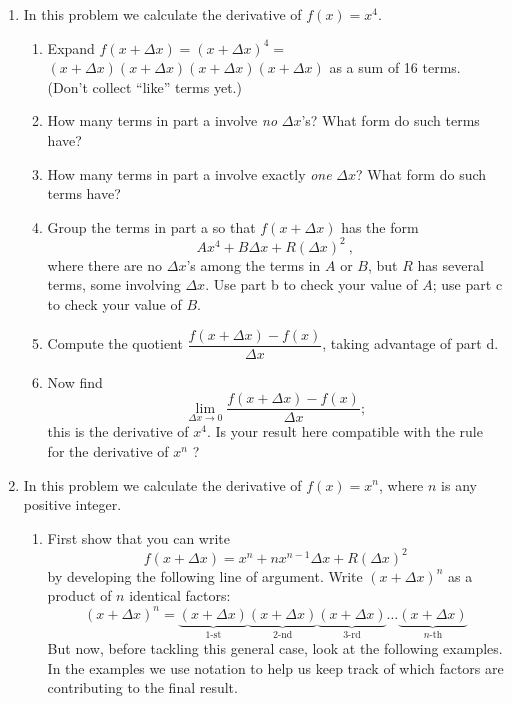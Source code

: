 \begin{enumerate}
\item In this problem we calculate the derivative of $f(x) = x^4$.

  \begin{enumerate}
  \item Expand $f(x + \Delta x) = (x + \Delta x)^4 =$ $(x + \Delta x)(x +
\Delta x)(x + \Delta x)(x + \Delta x)$ as a sum of 16 terms.  (Don't
collect ``like'' terms yet.)


  \item How many terms in part a involve {\em no\/} $\Delta x$'s?  What
form do such terms have?

  \item How many terms in part a involve exactly {\em one\/} $\Delta x$?
What form do such terms have?

  \item Group the terms in  part a  so that  $f(x + \Delta x)$  has the form
	\[
Ax^4 + B \Delta x + R (\Delta x)^2 \ ,
\]  
where there are no  $\Delta x$'s  among the terms in  $A$  or  $B$, but  $R$  has several terms, some involving  $\Delta x$.  Use part b to check your value of  $A$;  use part c to check your value of  $B$.

  \item Compute the quotient
$\dfrac{f(x + \Delta x) - f(x)}{\Delta x}$, taking advantage of  part d.

  \item Now find
	\[
\lim_{\Delta x \rightarrow 0} 
\dfrac{f(x + \Delta x) - f(x)}{\Delta x};
\]
this is the derivative of $x^4$.  Is your result here compatible with the rule for the derivative of $x^n$ ?


\end{enumerate}
\item In this problem we calculate the derivative of $f(x) = x^n$,
where $n$ is any positive integer.

  \begin{enumerate}
  \item First show that you can write
	\[
f(x + \Delta x) = x^n + nx^{n-1} \Delta x + R (\Delta x)^2
\]
by developing the following line of argument.  Write  $(x + \Delta x)^n$  as a product of  $n$  identical factors:
	\[
(x + \Delta x)^n = \underbrace{(x + \Delta x)}_{1\mbox{-st}}
                   \underbrace{(x + \Delta x)}_{2\mbox{-nd}}
                   \underbrace{(x + \Delta x)}_{3\mbox{-rd}} 
            \ldots \underbrace{(x + \Delta x)}_{n\mbox{-th}}
\] 
But now, before tackling this general case, look at the following
examples.  In the examples we use notation to help us keep track of
which factors are contributing to the final result.



\end{enumerate}
\end{enumerate}

